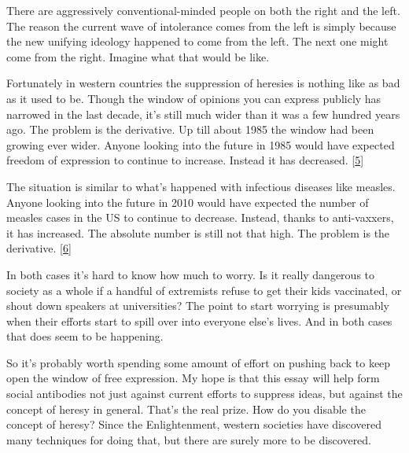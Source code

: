 There are aggressively conventional-minded
                  people on both the right and the left. The reason the current
                  wave of intolerance comes from the left is simply because the
                  new unifying ideology happened to come from the left. The next
                  one might come from the right. Imagine what that would be
                  like.

Fortunately in western countries the
                  suppression of heresies is nothing like as bad as it used to
                  be. Though the window of opinions you can express publicly has
                  narrowed in the last decade, it's still much wider than it was
                  a few hundred years ago. The problem is the derivative. Up
                  till about 1985 the window had been growing ever wider. Anyone
                  looking into the future in 1985 would have expected freedom of
                  expression to continue to increase. Instead it has decreased.
                  [\href{\#f5n}{5}]

The situation is similar to what's happened with
                  infectious diseases like measles. Anyone looking into the
                  future in 2010 would have expected the number of measles cases
                  in the US to continue to decrease. Instead, thanks to
                  anti-vaxxers, it has increased. The absolute number is still
                  not that high. The problem is the derivative.
                  [\href{\#f6n}{6}]

In both cases it's hard to know how much to
                  worry. Is it really dangerous to society as a whole if a
                  handful of extremists refuse to get their kids vaccinated, or
                  shout down speakers at universities? The point to start
                  worrying is presumably when their efforts start to spill over
                  into everyone else's lives. And in both cases that does seem
                  to be happening.

So it's probably worth spending
                  some amount of effort on pushing back to keep open the window
                  of free expression. My hope is that this essay will help form
                  social antibodies not just against current efforts to suppress
                  ideas, but against the concept of heresy in general. That's
                  the real prize. How do you disable the concept of heresy?
                  Since the Enlightenment, western societies have discovered
                  many techniques for doing that, but there are surely more to
                  be discovered.

